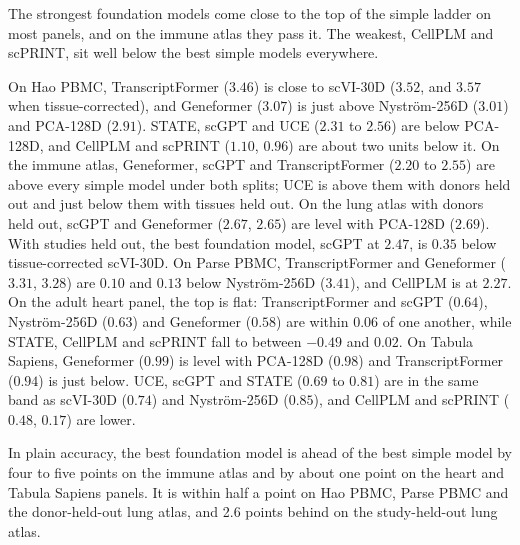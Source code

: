\documentclass[]{style}
\begin{document}
\begin{table}[t]
\centering
\caption{Pretrained foundation models on the curated Part A panels, next to the best
simple models. Each column is one panel's own fit; abilities are comparable within a
column. HLCA d.\ and s.\ are the lung atlas with donors and with studies held out; Immune
d.\ and t.\ the immune atlas with donors and with tissues held out.}
\label{tab:fm}
\footnotesize

\end{table}

The strongest foundation models come close to the top of the simple ladder on most
panels, and on the immune atlas they pass it.
The weakest, CellPLM and scPRINT, sit well below the best simple models everywhere.

On Hao PBMC, TranscriptFormer ($3.46$) is close to scVI-30D ($3.52$, and $3.57$ when
tissue-corrected), and Geneformer
($3.07$) is just above Nystr\"om-256D ($3.01$) and PCA-128D ($2.91$). STATE, scGPT and UCE
($2.31$ to $2.56$) are below PCA-128D, and CellPLM and scPRINT ($1.10$, $0.96$) are about
two units below it. On the immune atlas, Geneformer, scGPT and TranscriptFormer ($2.20$ to
$2.55$) are above every simple model under both splits; UCE is above them with donors held
out and just below them with tissues held out. On the lung atlas with donors held out,
scGPT and Geneformer ($2.67$, $2.65$) are level with PCA-128D ($2.69$). With studies held
out, the best foundation model, scGPT at $2.47$, is $0.35$ below tissue-corrected
scVI-30D. On Parse PBMC, TranscriptFormer and Geneformer ($3.31$, $3.28$) are $0.10$ and $0.13$ below
Nystr\"om-256D ($3.41$), and CellPLM is
at $2.27$. On the adult heart panel, the top is flat: TranscriptFormer and scGPT ($0.64$),
Nystr\"om-256D ($0.63$) and Geneformer ($0.58$) are within $0.06$ of one another, while
STATE, CellPLM and scPRINT fall to between $-0.49$ and $0.02$. On Tabula Sapiens,
Geneformer ($0.99$) is level with PCA-128D ($0.98$) and TranscriptFormer ($0.94$) is just
below. UCE, scGPT and STATE ($0.69$ to $0.81$) are in the same band as scVI-30D ($0.74$)
and Nystr\"om-256D ($0.85$), and CellPLM and scPRINT ($0.48$, $0.17$) are lower.

In plain accuracy, the best foundation model is ahead of the best simple model by four to
five points on the immune atlas and by about one point on the heart and Tabula Sapiens
panels. It is within half a point on Hao PBMC, Parse PBMC and the donor-held-out lung
atlas, and 2.6 points behind on the study-held-out lung atlas.
\end{document}
